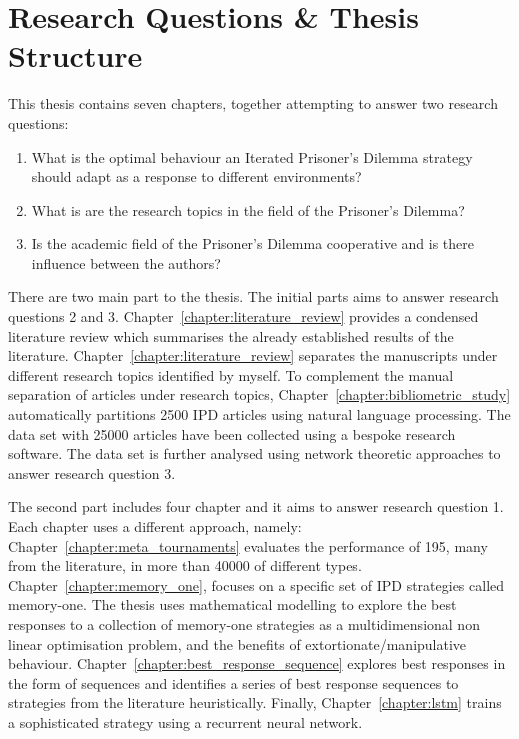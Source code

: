 \section{Research Questions \& Thesis Structure}\label{section:introduction_research_questions}

This thesis contains seven chapters, together attempting to answer two research
questions:

\begin{enumerate}
    \item What is the optimal behaviour an Iterated Prisoner's Dilemma strategy should adapt as a response to different
 environments?
    \item What is are the research topics in the field of the Prisoner's Dilemma?
    \item Is the academic field of the Prisoner's Dilemma cooperative and is there
    influence between the authors?
\end{enumerate}

There are two main part to the thesis. The initial parts aims to answer research
questions 2 and 3. Chapter~\ref{chapter:literature_review} provides a condensed
literature review which summarises the already established results of the
literature. Chapter~\ref{chapter:literature_review} separates the manuscripts
under different research topics identified by myself. To complement the manual
separation of articles under research topics,
Chapter~\ref{chapter:bibliometric_study} automatically partitions 2500 IPD
articles using natural language processing. The data set with 25000 articles have
been collected using a bespoke research software. The data set is further
analysed using network theoretic approaches to answer research question 3.

The second part includes four chapter and it aims to answer research question 1.
Each chapter uses a different approach, namely:
Chapter~\ref{chapter:meta_tournaments} evaluates the performance of 195, many
from the literature, in more than 40000 of different types.
Chapter~\ref{chapter:memory_one}, focuses on a specific set of IPD strategies
called memory-one. The thesis uses mathematical modelling to explore the best
responses to a collection of memory-one strategies as a multidimensional non
linear optimisation problem, and the benefits of extortionate/manipulative
behaviour. Chapter~\ref{chapter:best_response_sequence} explores best responses
in the form of sequences and identifies a series of best response sequences to
strategies from the literature heuristically. Finally,
Chapter~\ref{chapter:lstm} trains a sophisticated strategy using a recurrent neural
network.

